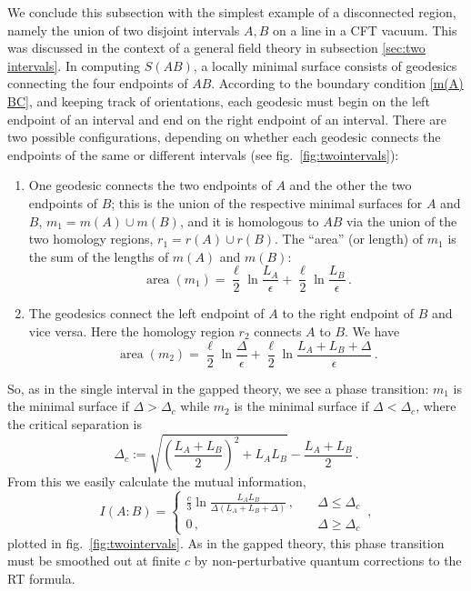 \documentclass[11pt]{article}
\DeclareMathOperator{\area}{area}
\begin{document}
We conclude this subsection with the simplest example of a disconnected region, namely the union of two disjoint intervals $A,B$ on a line in a CFT vacuum. This was discussed in the context of a general field theory in subsection \ref{sec:two intervals}. In computing $S(AB)$, a locally minimal surface consists of geodesics connecting the four endpoints of $AB$. According to the boundary condition \eqref{m(A) BC}, and keeping track of orientations, each geodesic must begin on the left endpoint of an interval and end on the right endpoint of an interval. There are two possible configurations, depending on whether each geodesic connects the endpoints of the same or different intervals (see fig.\ \ref{fig:twointervals}):
\begin{enumerate}
\item One geodesic connects the two endpoints of $A$ and the other the two endpoints of $B$; this is the union of the respective minimal surfaces for $A$ and $B$, $m_1=m(A)\cup m(B)$, and it is homologous to $AB$ via the union of the two homology regions, $r_1=r(A)\cup r(B)$. The ``area'' (or length) of $m_1$ is the sum of the lengths of $m(A)$ and $m(B)$:
\begin{equation}
\area(m_1)=\frac\ell2\ln\frac{L_A}\epsilon+\frac\ell2\ln\frac{L_B}\epsilon\,.
\end{equation}
\item The geodesics connect the left endpoint of $A$ to the right endpoint of $B$ and vice versa. Here the homology region $r_2$ connects $A$ to $B$. We have
\begin{equation}
\area(m_2)=\frac\ell2\ln\frac\Delta\epsilon+\frac\ell2\ln\frac{L_A+L_B+\Delta}\epsilon\,.
\end{equation}
\end{enumerate}
So, as in the single interval in the gapped theory, we see a phase transition: $m_1$ is the minimal surface if $\Delta>\Delta_c$ while $m_2$ is the minimal surface if $\Delta<\Delta_c$, where the critical separation is
\begin{equation}
\Delta_c:=\sqrt{\left(\frac{L_A+L_B}2\right)^2+L_AL_B}-\frac{L_A+L_B}2\,.
\end{equation}
From this we easily calculate the mutual information,
\begin{equation}\label{holoMI}
I(A:B)=\begin{cases}
\frac c3\ln\frac{L_AL_B}{\Delta(L_A+L_B+\Delta)}\,,\quad&\Delta\le\Delta_c \\
0\,,\quad&\Delta\ge\Delta_c
\end{cases}\,,
\end{equation}
plotted in fig.\ \ref{fig:twointervals}. As in the gapped theory, this phase transition must be smoothed out at finite $c$ by non-perturbative quantum corrections to the RT formula.
\end{document}
